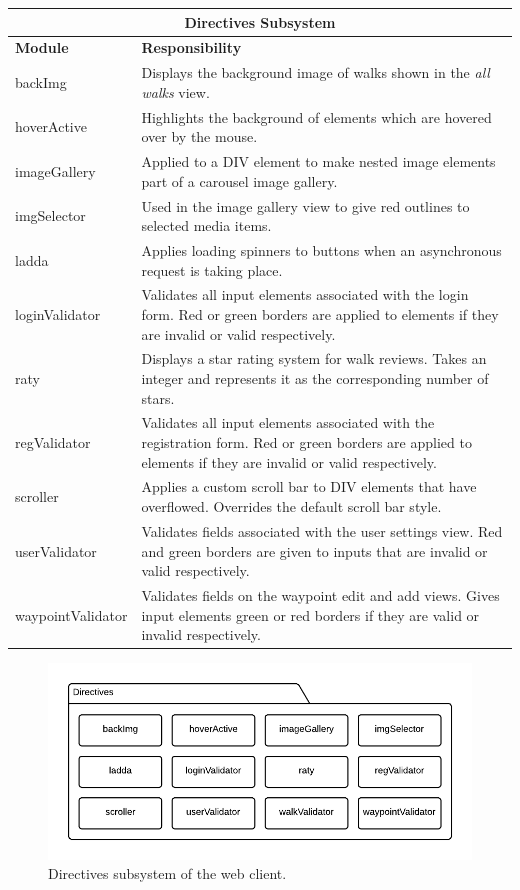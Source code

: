 \documentclass[11pt,a4paper]{report}
\begin{document}
\begin{center}
\begin{tabular}{|l|p{10cm}|}
\hline \multicolumn{2}{|c|}{\textbf{Directives Subsystem}} \\
\hline \textbf{Module} & \textbf{Responsibility} \\ 
\hline backImg & Displays the background image of walks shown in the \emph{all walks} view. \\
\hline hoverActive & Highlights the background of elements which are hovered over by the mouse. \\
\hline imageGallery & Applied to a DIV element to make nested image elements part of a carousel image gallery. \\
\hline imgSelector & Used in the image gallery view to give red outlines to selected media items. \\
\hline ladda & Applies loading spinners to buttons when an asynchronous request is taking place. \\
\hline loginValidator & Validates all input elements associated with the login form. Red or green borders are applied to elements if they are invalid or valid respectively. \\
\hline raty & Displays a star rating system for walk reviews. Takes an integer and represents it as the corresponding number of stars. \\
\hline regValidator & Validates all input elements associated with the registration form. Red or green borders are applied to elements if they are invalid or valid respectively. \\
\hline scroller & Applies a custom scroll bar to DIV elements that have overflowed. Overrides the default scroll bar style. \\
\hline userValidator & Validates fields associated with the user settings view. Red and green borders are given to inputs that are invalid or valid respectively. \\
\hline waypointValidator & Validates fields on the waypoint edit and add views. Gives input elements green or red borders if they are valid or invalid respectively. \\
\hline
\end{tabular} 
\end{center}

\begin{figure}[H]
\centering
\includegraphics[width=0.8\linewidth]{./img/web-client-uml/directives-subsystem-diagram}
\caption{Directives subsystem of the web client.}
\label{fig:directives-subsystem-diagram}
\end{figure}
\end{document}
